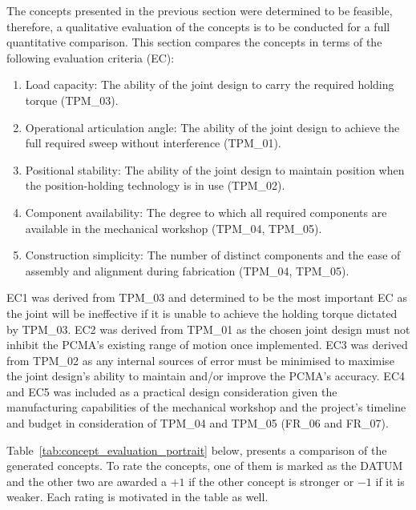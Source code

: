 The concepts presented in the previous section were determined to be feasible, therefore, a qualitative evaluation of the concepts is to be conducted for a full quantitative comparison. This section compares the concepts in terms of the following evaluation criteria (EC):
\begin{enumerate}[label=EC\arabic*]
	\item Load capacity: The ability of the joint design to carry the required holding torque (TPM\_03).
	\item Operational articulation angle: The ability of the joint design to achieve the full required sweep without interference (TPM\_01).
	\item Positional stability: The ability of the joint design to maintain position when the position-holding technology is in use (TPM\_02).
	\item Component availability: The degree to which all required components are available in the mechanical workshop (TPM\_04, TPM\_05).
	\item Construction simplicity: The number of distinct components and the ease of assembly and alignment during fabrication (TPM\_04, TPM\_05).
\end{enumerate}
EC1 was derived from TPM\_03 and determined to be the most important EC as the joint will be ineffective if it is unable to achieve the holding torque dictated by TPM\_03. EC2 was derived from TPM\_01 as the chosen joint design must not inhibit the PCMA's existing range of motion once implemented. EC3 was derived from TPM\_02  as any internal sources of error must be minimised to maximise the joint design's ability to maintain and/or improve the PCMA's accuracy. EC4 and EC5 was included as a practical design consideration given the manufacturing capabilities of the mechanical workshop and the project's timeline and budget in consideration of TPM\_04 and TPM\_05 (FR\_06 and FR\_07).

Table~\ref{tab:concept_evaluation_portrait} below, presents a comparison of the generated concepts. To rate the concepts, one of them is marked as the DATUM and the other two are awarded a $+1$ if the other concept is stronger or $-1$ if it is weaker. Each rating is motivated in the table as well.

